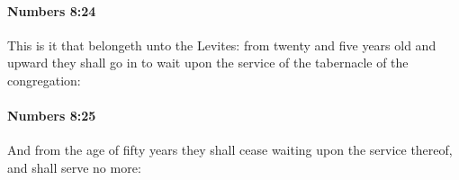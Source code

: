 		\paragraph{Numbers 8:24} %
			\label{NUMBERS-8-24}

			This is it that belongeth unto the Levites: from twenty and five years old and upward they shall go in to wait upon the service of the tabernacle of the congregation:


		\paragraph{Numbers 8:25} %
			\label{NUMBERS-8-25}

			And from the age of fifty years they shall cease waiting upon the service thereof, and shall serve no more:


